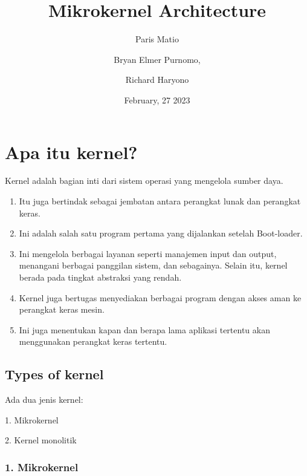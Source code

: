 \documentclass{report}
\begin{document}
	
	\title{{\Huge Mikrokernel Architecture}}
	
	\author{
		{\large Paris Matio} \and 
		{\large Bryan Elmer Purnomo}, \and 
		{\large Richard Haryono}
		}
	
	\date{February, 27 2023}
	
	\maketitle
	
	\chapter*{Apa itu kernel?}
	Kernel adalah bagian inti dari sistem operasi yang mengelola sumber daya. 
	
	\begin{enumerate}
	
	\item Itu juga bertindak sebagai jembatan antara perangkat lunak dan perangkat keras. 
	
	\item Ini adalah salah satu program pertama yang dijalankan setelah Boot-loader.
	
	\item Ini mengelola berbagai layanan seperti manajemen input dan output, menangani berbagai panggilan sistem, dan sebagainya. Selain itu, kernel berada pada tingkat abstraksi yang rendah.
	
	\item Kernel juga bertugas menyediakan berbagai program dengan akses aman ke perangkat keras mesin. 
	
	\item Ini juga menentukan kapan dan berapa lama aplikasi tertentu akan menggunakan perangkat keras tertentu.
	
	\end{enumerate}	

	\section*{Types of kernel}
	
	Ada dua jenis kernel:
	
	1. Mikrokernel
	
	2. Kernel monolitik
	
	\subsection*{1. Mikrokernel}
	
\end{document}
